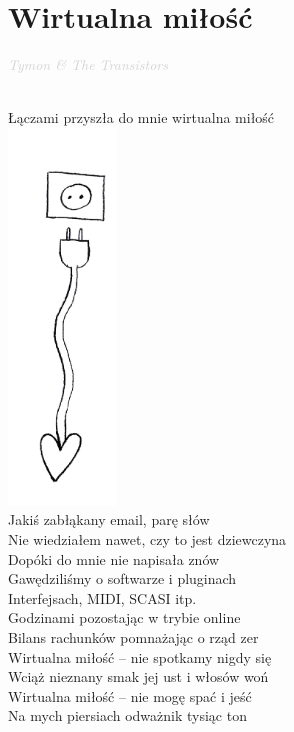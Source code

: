 \documentclass[a5paper, 10pt]{book}
\begin{document}
\section{Wirtualna miłość}\textcolor{lightgray}{\textit{Tymon \& The Transistors}}\\~\\
\begin{minipage}[t]{0.8\textwidth}
Łączami przyszła do mnie wirtualna miłość\\
\includegraphics[height=10cm, right]{wirtualna_milosc.png}\vspace*{-10.1cm}\\
Jakiś zabłąkany email, parę słów\\
Nie wiedziałem nawet, czy to jest dziewczyna\\
Dopóki do mnie nie napisała znów\\
Gawędziliśmy o softwarze i pluginach\\
Interfejsach, MIDI, SCASI itp.\\
Godzinami pozostając w trybie online\\
Bilans rachunków pomnażając o rząd zer\\

\hspace*{5mm}Wirtualna miłość – nie spotkamy nigdy się\\
\hspace*{5mm}Wciąż nieznany smak jej ust i włosów woń\\
\hspace*{5mm}Wirtualna miłość – nie mogę spać i jeść\\
\hspace*{5mm}Na mych piersiach odważnik tysiąc ton\\


\end{minipage}
\end{document}
